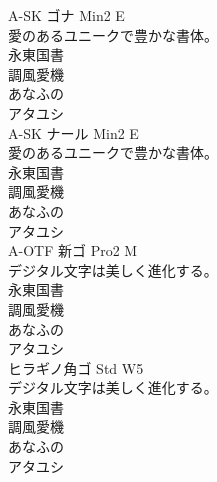 \documentclass[a4paper,11pt]{ltjsarticle}
\begin{document}
  A-SK ゴナ Min2 E\\
  愛のあるユニークで豊かな書体。\\
  永東国書\\
  調風愛機\\
  あなふの\\
  アタユシ\\
  
  A-SK ナール Min2 E\\
  愛のあるユニークで豊かな書体。\\
  永東国書\\
  調風愛機\\
  あなふの\\
  アタユシ\\

  A-OTF 新ゴ Pro2 M\\
  デジタル文字は美しく進化する。\\
  永東国書\\
  調風愛機\\
  あなふの\\
  アタユシ\\

  ヒラギノ角ゴ Std W5\\
  デジタル文字は美しく進化する。\\
  永東国書\\
  調風愛機\\
  あなふの\\
  アタユシ\\
\end{document}
